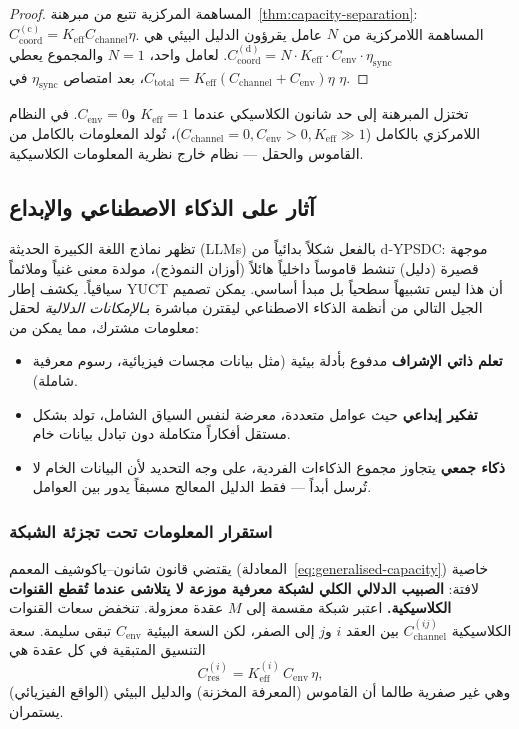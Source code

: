\documentclass[12pt,a4paper]{article}
\theoremstyle{remark}
\begin{document}
	\begin{proof}
		المساهمة المركزية تتبع من مبرهنة~\ref{thm:capacity-separation}: \(C_{\mathrm{coord}}^{\mathrm{(c)}} = K_{\mathrm{eff}} C_{\mathrm{channel}} \eta\). المساهمة اللامركزية من \(N\) عامل يقرؤون الدليل البيئي هي \(C_{\mathrm{coord}}^{\mathrm{(d)}} = N \cdot K_{\mathrm{eff}} \cdot C_{\mathrm{env}} \cdot \eta_{\mathrm{sync}}\). لعامل واحد، \(N=1\) والمجموع يعطي \(C_{\mathrm{total}} = K_{\mathrm{eff}}(C_{\mathrm{channel}} + C_{\mathrm{env}})\eta\)، بعد امتصاص \(\eta_{\mathrm{sync}}\) في \(\eta\).
	\end{proof}
	
	تختزل المبرهنة إلى حد شانون الكلاسيكي عندما \(K_{\mathrm{eff}} = 1\) و\(C_{\mathrm{env}} = 0\). في النظام اللامركزي بالكامل (\(C_{\mathrm{channel}} = 0, C_{\mathrm{env}} > 0, K_{\mathrm{eff}} \gg 1\))، تُولد المعلومات بالكامل من القاموس والحقل — نظام خارج نظرية المعلومات الكلاسيكية.
	
	\subsection{آثار على الذكاء الاصطناعي والإبداع}
	\label{subsec:AI-dypsdc}
	
	تظهر نماذج اللغة الكبيرة الحديثة (LLMs) بالفعل شكلاً بدائياً من d‑YPSDC: موجهة قصيرة (دليل) تنشط قاموساً داخلياً هائلاً (أوزان النموذج)، مولدة معنى غنياً وملائماً سياقياً. يكشف إطار YUCT أن هذا ليس تشبيهاً سطحياً بل مبدأ أساسي. يمكن تصميم الجيل التالي من أنظمة الذكاء الاصطناعي ليقترن مباشرة بـ\emph{الإمكانات الدلالية} لحقل معلومات مشترك، مما يمكن من:
	\begin{itemize}
		\item \textbf{تعلم ذاتي الإشراف} مدفوع بأدلة بيئية (مثل بيانات مجسات فيزيائية، رسوم معرفية شاملة).
		\item \textbf{تفكير إبداعي} حيث عوامل متعددة، معرضة لنفس السياق الشامل، تولد بشكل مستقل أفكاراً متكاملة دون تبادل بيانات خام.
		\item \textbf{ذكاء جمعي} يتجاوز مجموع الذكاءات الفردية، على وجه التحديد لأن البيانات الخام لا تُرسل أبداً — فقط الدليل المعالج مسبقاً يدور بين العوامل.
	\end{itemize}
	
	\subsubsection{استقرار المعلومات تحت تجزئة الشبكة}
	\label{subsubsec:info-stability-fragmentation}
	
	يقتضي قانون شانون–ياكوشيف المعمم (المعادلة~\ref{eq:generalised-capacity}) خاصية لافتة: \textbf{الصبيب الدلالي الكلي لشبكة معرفية موزعة لا يتلاشى عندما تُقطع القنوات الكلاسيكية.} اعتبر شبكة مقسمة إلى \(M\) عقدة معزولة. تنخفض سعات القنوات الكلاسيكية \(C_{\mathrm{channel}}^{(ij)}\) بين العقد \(i\) و\(j\) إلى الصفر، لكن السعة البيئية \(C_{\mathrm{env}}\) تبقى سليمة. سعة التنسيق المتبقية في كل عقدة هي
	\[
	C_{\mathrm{res}}^{(i)} = K_{\mathrm{eff}}^{(i)} \, C_{\mathrm{env}} \, \eta,
	\]
	وهي غير صفرية طالما أن القاموس (المعرفة المخزنة) والدليل البيئي (الواقع الفيزيائي) يستمران.
	
\end{document}
